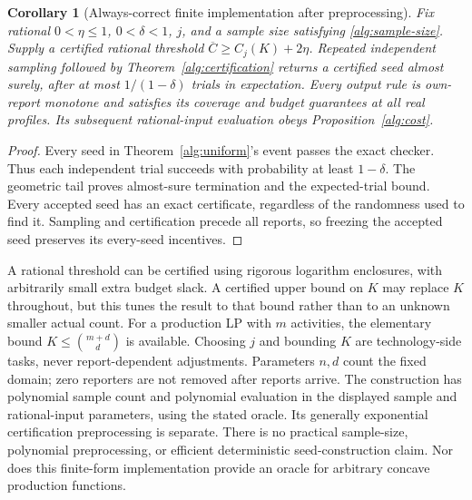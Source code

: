 \documentclass[11pt]{article}
\newtheorem{corollary}[theorem]{Corollary}
\theoremstyle{definition}\newtheorem{definition}[theorem]{Definition}
\theoremstyle{remark}\newtheorem{remark}[theorem]{Remark}
\begin{document}
\begin{corollary}[Always-correct finite implementation after preprocessing]
\label{alg:las-vegas}
Fix rational $0<\eta\le1$, $0<\delta<1$, $j$, and a sample size satisfying
\eqref{alg:sample-size}.  Supply a certified rational threshold
$\overline C\ge C_j(K)+2\eta$.
Repeated independent sampling followed by Theorem~\ref{alg:certification}
returns a certified seed almost surely, after at most $1/(1-\delta)$ trials
in expectation.  Every output rule is own-report monotone and satisfies its
coverage and budget guarantees at all real profiles.  Its subsequent
rational-input evaluation obeys Proposition~\ref{alg:cost}.
\end{corollary}
\begin{proof}
Every seed in Theorem~\ref{alg:uniform}'s event passes the exact checker.
Thus each independent trial succeeds with probability at least $1-\delta$.
The geometric tail proves almost-sure termination and the expected-trial
bound.  Every accepted seed has an exact certificate, regardless of the
randomness used to find it.  Sampling and certification precede all reports,
so freezing the accepted seed preserves its every-seed incentives.
\end{proof}
A rational threshold can be certified using rigorous logarithm enclosures,
with arbitrarily small extra budget slack.  A certified upper bound on $K$
may replace $K$ throughout, but this tunes the result to that bound rather
than to an unknown smaller actual count.  For a production LP with $m$
activities, the elementary bound $K\le\binom{m+d}{d}$ is available.
Choosing $j$ and bounding $K$ are technology-side tasks, never report-dependent
adjustments.  Parameters $n,d$ count the fixed domain; zero reporters are not
removed after reports arrive.
The construction has polynomial sample count and polynomial evaluation in
the displayed sample and rational-input parameters, using the stated oracle.
Its generally exponential certification preprocessing is separate.  There is
no practical sample-size, polynomial preprocessing, or efficient deterministic
seed-construction claim.  Nor does this finite-form implementation provide an
oracle for arbitrary concave production functions.
\end{document}
